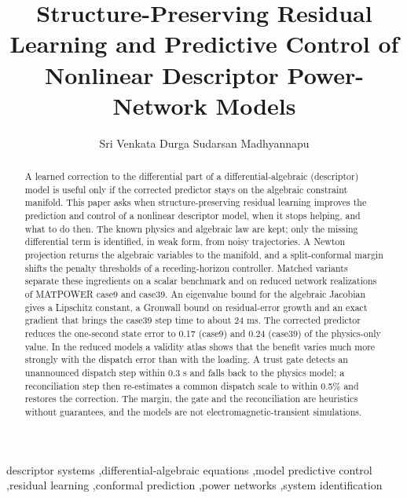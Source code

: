 \documentclass[preprint,12pt]{elsarticle}
\begin{document}
\begin{frontmatter}
\title{Structure-Preserving Residual Learning and Predictive Control of Nonlinear Descriptor Power-Network Models}
\author[a]{Sri Venkata Durga Sudarsan Madhyannapu}

\begin{abstract}
A learned correction to the differential part of a differential-algebraic (descriptor) model is useful only if the corrected predictor stays on the algebraic constraint manifold. This paper asks when structure-preserving residual learning improves the prediction and control of a nonlinear descriptor model, when it stops helping, and what to do then. The known physics and algebraic law are kept; only the missing differential term is identified, in weak form, from noisy trajectories. A Newton projection returns the algebraic variables to the manifold, and a split-conformal margin shifts the penalty thresholds of a receding-horizon controller. Matched variants separate these ingredients on a scalar benchmark and on reduced network realizations of MATPOWER case9 and case39. An eigenvalue bound for the algebraic Jacobian gives a Lipschitz constant, a Gronwall bound on residual-error growth and an exact gradient that brings the case39 step time to about 24 ms. The corrected predictor reduces the one-second state error to 0.17 (case9) and 0.24 (case39) of the physics-only value. In the reduced models a validity atlas shows that the benefit varies much more strongly with the dispatch error than with the loading. A trust gate detects an unannounced dispatch step within 0.3 s and falls back to the physics model; a reconciliation step then re-estimates a common dispatch scale to within 0.5\% and restores the correction. The margin, the gate and the reconciliation are heuristics without guarantees, and the models are not electromagnetic-transient simulations.
\end{abstract}
\begin{keyword}
descriptor systems \sep differential-algebraic equations \sep model predictive control \sep residual learning \sep conformal prediction \sep power networks \sep system identification
\end{keyword}
\end{frontmatter}
\end{document}
